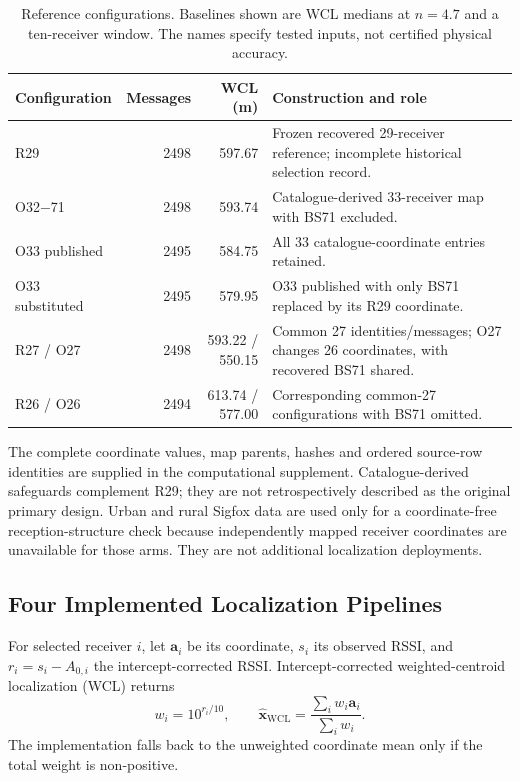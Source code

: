 \documentclass[11pt,a4paper]{article}
\begin{document}
\begin{table}[htbp]
\centering\small
\caption{Reference configurations. Baselines shown are WCL medians at $n=4.7$ and a ten-receiver window. The names specify tested inputs, not certified physical accuracy.}\label{tab:maps}
\begin{tabularx}{\textwidth}{lrrY}
\toprule Configuration & Messages & WCL (m) & Construction and role\\\midrule
R29 &2498&597.67&Frozen recovered 29-receiver reference; incomplete historical selection record.\\
O32$-$71 &2498&593.74&Catalogue-derived 33-receiver map with BS71 excluded.\\
O33 published &2495&584.75&All 33 catalogue-coordinate entries retained.\\
O33 substituted &2495&579.95&O33 published with only BS71 replaced by its R29 coordinate.\\
R27 / O27 &2498&593.22 / 550.15&Common 27 identities/messages; O27 changes 26 coordinates, with recovered BS71 shared.\\
R26 / O26 &2494&613.74 / 577.00&Corresponding common-27 configurations with BS71 omitted.\\\bottomrule
\end{tabularx}
\end{table}
The complete coordinate values, map parents, hashes and ordered source-row identities are supplied in the computational supplement. Catalogue-derived safeguards complement R29; they are not retrospectively described as the original primary design. Urban and rural Sigfox data are used only for a coordinate-free reception-structure check because independently mapped receiver coordinates are unavailable for those arms. They are not additional localization deployments.

\subsection{Four Implemented Localization Pipelines}\label{sec:estimators}
For selected receiver $i$, let $\mathbf a_i$ be its coordinate, $s_i$ its observed RSSI, and $r_i=s_i-A_{0,i}$ the intercept-corrected RSSI. Intercept-corrected weighted-centroid localization (WCL) returns
\begin{equation}
 w_i=10^{r_i/10},\qquad \widehat{\mathbf x}_{\mathrm{WCL}}=\frac{\sum_iw_i\mathbf a_i}{\sum_iw_i}.
\label{eq:wcl}
\end{equation}
The implementation falls back to the unweighted coordinate mean only if the total weight is non-positive.
\end{document}
